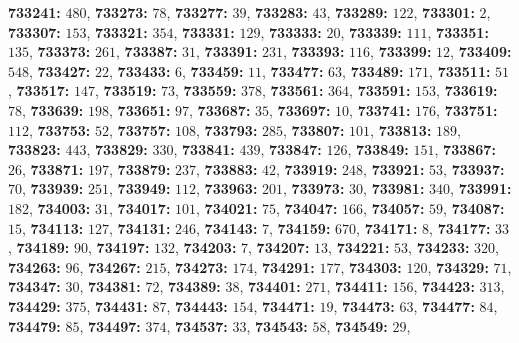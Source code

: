 \textsf{\bfseries 733241:} $480$, \textsf{\bfseries 733273:} $78$, \textsf{\bfseries 733277:} $39$, \textsf{\bfseries 733283:} $43$, \textsf{\bfseries 733289:} $122$, \textsf{\bfseries 733301:} $2$, \textsf{\bfseries 733307:} $153$, \textsf{\bfseries 733321:} $354$, \textsf{\bfseries 733331:} $129$, \textsf{\bfseries 733333:} $20$, \textsf{\bfseries 733339:} $111$, \textsf{\bfseries 733351:} $135$, \textsf{\bfseries 733373:} $261$, \textsf{\bfseries 733387:} $31$, \textsf{\bfseries 733391:} $231$, \textsf{\bfseries 733393:} $116$, \textsf{\bfseries 733399:} $12$, \textsf{\bfseries 733409:} $548$, \textsf{\bfseries 733427:} $22$, \textsf{\bfseries 733433:} $6$, \textsf{\bfseries 733459:} $11$, \textsf{\bfseries 733477:} $63$, \textsf{\bfseries 733489:} $171$, \textsf{\bfseries 733511:} $51$, \textsf{\bfseries 733517:} $147$, \textsf{\bfseries 733519:} $73$, \textsf{\bfseries 733559:} $378$, \textsf{\bfseries 733561:} $364$, \textsf{\bfseries 733591:} $153$, \textsf{\bfseries 733619:} $78$, \textsf{\bfseries 733639:} $198$, \textsf{\bfseries 733651:} $97$, \textsf{\bfseries 733687:} $35$, \textsf{\bfseries 733697:} $10$, \textsf{\bfseries 733741:} $176$, \textsf{\bfseries 733751:} $112$, \textsf{\bfseries 733753:} $52$, \textsf{\bfseries 733757:} $108$, \textsf{\bfseries 733793:} $285$, \textsf{\bfseries 733807:} $101$, \textsf{\bfseries 733813:} $189$, \textsf{\bfseries 733823:} $443$, \textsf{\bfseries 733829:} $330$, \textsf{\bfseries 733841:} $439$, \textsf{\bfseries 733847:} $126$, \textsf{\bfseries 733849:} $151$, \textsf{\bfseries 733867:} $26$, \textsf{\bfseries 733871:} $197$, \textsf{\bfseries 733879:} $237$, \textsf{\bfseries 733883:} $42$, \textsf{\bfseries 733919:} $248$, \textsf{\bfseries 733921:} $53$, \textsf{\bfseries 733937:} $70$, \textsf{\bfseries 733939:} $251$, \textsf{\bfseries 733949:} $112$, \textsf{\bfseries 733963:} $201$, \textsf{\bfseries 733973:} $30$, \textsf{\bfseries 733981:} $340$, \textsf{\bfseries 733991:} $182$, \textsf{\bfseries 734003:} $31$, \textsf{\bfseries 734017:} $101$, \textsf{\bfseries 734021:} $75$, \textsf{\bfseries 734047:} $166$, \textsf{\bfseries 734057:} $59$, \textsf{\bfseries 734087:} $15$, \textsf{\bfseries 734113:} $127$, \textsf{\bfseries 734131:} $246$, \textsf{\bfseries 734143:} $7$, \textsf{\bfseries 734159:} $670$, \textsf{\bfseries 734171:} $8$, \textsf{\bfseries 734177:} $33$, \textsf{\bfseries 734189:} $90$, \textsf{\bfseries 734197:} $132$, \textsf{\bfseries 734203:} $7$, \textsf{\bfseries 734207:} $13$, \textsf{\bfseries 734221:} $53$, \textsf{\bfseries 734233:} $320$, \textsf{\bfseries 734263:} $96$, \textsf{\bfseries 734267:} $215$, \textsf{\bfseries 734273:} $174$, \textsf{\bfseries 734291:} $177$, \textsf{\bfseries 734303:} $120$, \textsf{\bfseries 734329:} $71$, \textsf{\bfseries 734347:} $30$, \textsf{\bfseries 734381:} $72$, \textsf{\bfseries 734389:} $38$, \textsf{\bfseries 734401:} $271$, \textsf{\bfseries 734411:} $156$, \textsf{\bfseries 734423:} $313$, \textsf{\bfseries 734429:} $375$, \textsf{\bfseries 734431:} $87$, \textsf{\bfseries 734443:} $154$, \textsf{\bfseries 734471:} $19$, \textsf{\bfseries 734473:} $63$, \textsf{\bfseries 734477:} $84$, \textsf{\bfseries 734479:} $85$, \textsf{\bfseries 734497:} $374$, \textsf{\bfseries 734537:} $33$, \textsf{\bfseries 734543:} $58$, \textsf{\bfseries 734549:} $29$, 
